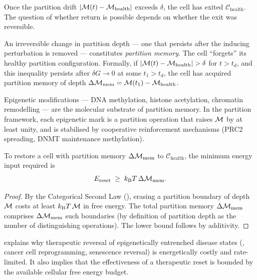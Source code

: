 Once the partition drift $|\mathcal{M}(t) - \mathcal{M}_{\mathrm{health}}|$ exceeds $\delta$,
the cell has exited $\mathcal{C}_{\mathrm{health}}$.  The question of whether
return is possible depends on whether the exit was reversible.

\begin{definition}
\label{def:partition-memory}
An irreversible change in partition depth — one that persists after the
inducing perturbation is removed — constitutes \emph{partition memory}.
The cell ``forgets'' its healthy partition configuration.  Formally, if
$|\mathcal{M}(t) - \mathcal{M}_{\mathrm{health}}| > \delta$ for $t > t_d$, and this
inequality persists after $\delta G \to 0$ at some $t_1 > t_d$, the cell
has acquired partition memory of depth $\Delta\mathcal{M}_{\mathrm{mem}} = \mathcal{M}(t_1) - \mathcal{M}_{\mathrm{health}}$.
\end{definition}

Epigenetic modifications — DNA methylation, histone acetylation, chromatin
remodelling — are the molecular substrate of partition memory.  In the
partition framework, each epigenetic mark is a partition operation that
raises $\mathcal{M}$ by at least unity, and is stabilised by cooperative
reinforcement mechanisms (PRC2 spreading, DNMT maintenance methylation).

\begin{theorem}
\label{thm:reset-energy}
To restore a cell with partition memory $\Delta\mathcal{M}_{\mathrm{mem}}$ to
$\mathcal{C}_{\mathrm{health}}$, the minimum energy input required is
\begin{equation}
  E_{\mathrm{reset}}
  \;\geq\; k_{\mathrm{B}} T\,\Delta\mathcal{M}_{\mathrm{mem}}.
  \label{eq:reset-energy}
\end{equation}
\end{theorem}

\begin{proof}
By the Categorical Second Law (), erasing a partition
boundary of depth $\mathcal{M}$ costs at least $k_{\mathrm{B}} T\,\mathcal{M}$ in free energy.
The total partition memory $\Delta\mathcal{M}_{\mathrm{mem}}$ comprises
$\Delta\mathcal{M}_{\mathrm{mem}}$ such boundaries (by definition of partition
depth as the number of distinguishing operations).  The lower bound follows
by additivity.
\end{proof}

\begin{remark}
 explains why therapeutic reversal of epigenetically
entrenched disease states (\eg, cancer cell reprogramming, senescence reversal)
is energetically costly and rate-limited.  It also implies that the effectiveness
of a therapeutic reset is bounded by the available cellular free energy budget.
\end{remark}


